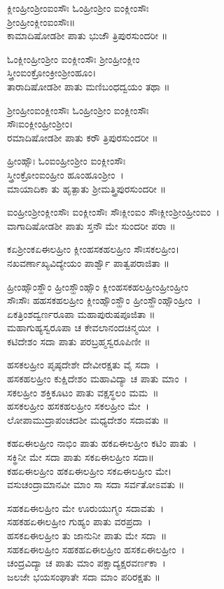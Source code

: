 ಕ್ಲೀಂಹ್ರೀಂಶ್ರೀಂಐಂಸೌಃ ಓಂಹ್ರೀಂಶ್ರೀಂ ಐಂಕ್ಲೀಂಸೌಃ\\ ಶ್ರೀಂಹ್ರೀಂಕ್ಲೀಂಐಂಸೌಃ॥\\
ಕಾಮಾದಿಷೋಡಶೀ ಪಾತು ಭುಜೌ ತ್ರಿಪುರಸುಂದರೀ ॥

ಓಂಕ್ಲೀಂಹ್ರೀಂಶ್ರೀಂ ಐಂಕ್ಲೀಂಸೌಃ  ಶ್ರೀಂಹ್ರೀಂಕ್ಲೀಂ\\ ಸ್ತ್ರೀಂಐಂಕ್ರೋಂಕ್ರೀಂಶ್ರೀಂಹೂಂ।\\
ತಾರಾದಿಷೋಡಶೀ ಪಾತು ಮಣಿಬಂಧದ್ವಯಂ ತಥಾ ॥

ಶ್ರೀಂಹ್ರೀಂಐಂಕ್ಲೀಂಸೌಃ ಓಂಹ್ರೀಂಶ್ರೀಂ ಐಂಕ್ಲೀಂಸೌಃ\\ ಸೌಃಐಂಕ್ಲೀಂಹ್ರೀಂಶ್ರೀಂ।\\
ರಮಾದಿಷೋಡಶೀ ಪಾತು ಕರೌ ತ್ರಿಪುರಸುಂದರೀ ॥

ಹ್ರೀಂಹ್ಸೌಃ ಓಂಐಂಹ್ರೀಂಶ್ರೀಂ ಐಂಕ್ಲೀಂಸೌಃ \\ಸ್ತ್ರೀಂಕ್ರೋಂಐಂಹ್ರೀಂ ಹೂಂಹೂಂಶ್ರೀಂ~।\\
ಮಾಯಾದಿಕಾ ತು ಹೃತ್ಪಾತು ಶ್ರೀಮತ್ತ್ರಿಪುರಸುಂದರೀ ॥

ಐಂಹ್ರೀಂಶ್ರೀಂಕ್ಲೀಂಸೌಃ ಐಂಕ್ಲೀಂಸೌಃ ಸೌಃಕ್ಲೀಂಐಂ ಸೌಃಕ್ಲೀಂಶ್ರೀಂಹ್ರೀಂಐಂ~।\\
ವಾಗಾದಿಷೋಡಶೀ ಪಾತು ಸ್ತನೌ ಮೇ ಸುಂದರೀ ಪರಾ ॥

ಕಏಶ್ರೀಂಕಏಈಲಹ್ರೀಂ ಕ್ಲೀಂಹಸಕಹಲಹ್ರೀಂ ಸೌಃಸಕಲಹ್ರೀಂ।\\
ನಖವರ್ಣಾಖ್ಯವಿದ್ಯೇಯಂ ಪಾರ್ಶ್ವೌ ಪಾತ್ವಪರಾಜಿತಾ ॥

ಹ್ರೀಂಹ್ಸೌಂಸ್ಹೌಂ ಹ್ರೀಂಸ್ಹೌಂಹ್ಸೌಂ ಕ್ಲೀಂಹಸಕಹಲಹ್ರೀಂಹ್ರೀಂಹ್ರೀಂ\\ ಸೌಃಸೌಃ ಹಹಸಕಹಲಹ್ರೀಂ ಕ್ಲೀಂಹ್ಸೌಂಸ್ಹೌಂ ಹ್ರೀಂಸ್ಹೌಂಹ್ಸೌಂಹ್ರೀಂ~।\\
ಏಕತ್ರಿಂಶದ್ವರ್ಣರೂಪಾ ಮಹಾಪುರುಷಪೂಜಿತಾ ॥\\
ಮಹಾಗುಹ್ಯಸ್ವರೂಪಾ ಚ ಕೇವಲಾನಂದಚಿನ್ಮಯೀ~।\\
ಕಟಿದೇಶಂ ಸದಾ ಪಾತು ಪರಬ್ರಹ್ಮಸ್ವರೂಪಿಣೀ ॥

ಹಸಕಲಹ್ರೀಂ ಪೃಷ್ಠದೇಶೇ ದೇವೀರಕ್ಷತು ವೈ ಸದಾ~।\\
ಹಸಕಹಲಹ್ರೀಂ ಕುಕ್ಷಿದೇಶಂ ಮಹಾವಿದ್ಯಾ ಚ ಪಾತು ಮಾಂ~।\\
ಸಕಲಹ್ರೀಂ ಶಕ್ತಿಕೂಟಂ ಪಾತು ವಕ್ಷಸ್ಥಲಂ ಮಮ~॥\\
ಹಸಕಲಹ್ರೀಂ ಹಸಕಹಲಹ್ರೀಂ ಸಕಲಹ್ರೀಂ ಮೇ~।\\
ಲೋಪಾಮುದ್ರಾಪಂಚದಶೀ ಮಧ್ಯದೇಶಂ ಸದಾವತು ॥

ಕಹಏಈಲಹ್ರೀಂ ನಾಭಿಂ ಪಾತು ಹಕಏಈಲಹ್ರೀಂ ಕಟಿಂ ಪಾತು~।\\
ಸಕ್ಥಿನೀ ಮೇ ಸದಾ ಪಾತು ಸಕಏಈಲಹ್ರೀಂ ಸದಾ॥\\
ಕಹಏಈಲಹ್ರೀಂ ಹಕಏಈಲಹ್ರೀಂ ಸಕಏಈಲಹ್ರೀಂ ಮೇ।\\
ವಸುಚಂದ್ರಾಮಾನವೀ ಮಾಂ ಸಾ ಸದಾ ಸರ್ವತೋಽವತು ॥

ಸಹಕಏಈಲಹ್ರೀಂ ಮೇ ಊರುಯುಗ್ಮಂ ಸದಾವತು~।\\
ಸಹಕಹಏಈಲಹ್ರೀಂ ಗುಹ್ಯಂ ಪಾತು ವರಪ್ರದಾ~।\\
ಹಸಕಏಈಲಹ್ರೀಂ ತು ಜಾನುನೀ ಪಾತು ಮೇ ಸದಾ~॥\\
ಸಹಕಏಈಲಹ್ರೀಂ ಸಹಕಹಏಈಲಹ್ರೀಂ ಹಸಕಏಈಲಹ್ರೀಂ~।\\
ಚಂದ್ರವಿದ್ಯಾ ಚ ಪಾತು ಮಾಂ ಪಕ್ಷಾದ್ಯಕ್ಷರವರ್ಣಕಾ~।\\
ಜಲಜೇ ಭಯಸಂಘಾತೇ ಸದಾ ಮಾಂ ಪರಿರಕ್ಷತು ॥

